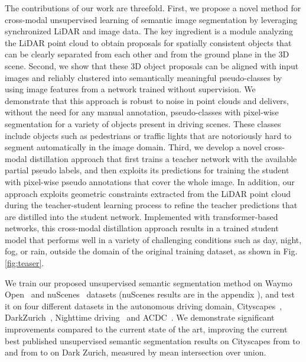 \documentclass[runningheads]{llncs}
\newcommand{\supp}{appendix\xspace}
\begin{document}
The contributions of our work are threefold. First, we propose a novel method for cross-modal unsupervised learning of semantic image segmentation by leveraging synchronized LiDAR and image data. The key ingredient is a module analyzing the LiDAR point cloud to obtain proposals for spatially consistent objects that can be clearly separated from each other and from the ground plane in the 3D scene. 
Second, we show that these 3D object proposals can be aligned with input images and reliably clustered into semantically meaningful pseudo-classes 
by using image features from a network trained without supervision.
We demonstrate that this approach is robust to noise in point clouds and delivers, without the need for any manual annotation, pseudo-classes with pixel-wise segmentation for a variety of objects present in driving scenes. These classes include objects such as pedestrians or traffic lights that are notoriously hard to segment automatically in the image domain. Third, we develop a novel cross-modal distillation approach that first trains a teacher network with the available partial pseudo labels, and then exploits its predictions for training the student with pixel-wise pseudo annotations 
that cover the whole image.
In addition, our approach exploits geometric constraints extracted from the LiDAR point cloud during the teacher-student learning process to refine the teacher predictions that are distilled into the student network. Implemented with transformer-based networks, this cross-modal distillation approach 
results in a trained student model that performs well in a variety of challenging conditions such as day, night, fog, or rain, outside the domain of the original training dataset, as shown in Fig.\,\ref{fig:teaser}.

We train our proposed  unsupervised  semantic  segmentation  method  on Waymo Open~\cite{sun2020scalability} and nuScenes~\cite{nuscenes} datasets (nuScenes results are in the 
\supp
), and test it on four different datasets in the autonomous driving domain, Cityscapes~\cite{Cordts2016Cityscapes}, DarkZurich~\cite{SDV20}, Nighttime driving~\cite{daytime:2:nighttime} and ACDC~\cite{SDV21}. We demonstrate significant improvements compared to the current state of the art, improving the current best published unsupervised semantic segmentation results on Cityscapes from  to  and from  to  on Dark Zurich, measured by mean intersection over union.
\end{document}
